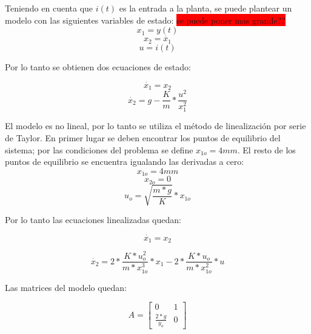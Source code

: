 \noindent Teniendo en cuenta que $i(t)$ es la entrada a la planta, se puede plantear un modelo con las siguientes variables de estado:\newline
\colorbox{red}{se puede poner mas grande??}
\begin{equation}
	x_{1}=y(t)
\end{equation}
\begin{equation}
	x_{2}=\dot{x_{1}}
\end{equation}
\begin{equation}
	u=i(t)
\end{equation}

\noindent Por lo tanto se obtienen dos ecuaciones de estado:

\begin{equation}
	\dot{x_{1}}=x_{2}
\end{equation}
\begin{equation}
	\dot{x_{2}}=g-\frac{K}{m}*\frac{u^{2}}{x_{1}^{2}}
\end{equation}

El modelo es no lineal, por lo tanto se utiliza el método de linealización por serie de Taylor. En primer lugar se deben encontrar los puntos de equilibrio del sistema; por las condiciones del problema se define $x_{1o}=4mm$. El resto de los puntos de equilibrio se encuentra igualando las derivadas a cero:
\begin{equation}
	x_{1o}=4mm
\end{equation}
\begin{equation}
	x_{2o}=0
\end{equation}
\begin{equation}
	u_{o}=\sqrt{\frac{m*g}{K}}*x_{1o}
\end{equation}

Por lo tanto las ecuaciones linealizadas quedan:

\begin{equation}
	\dot{x_{1}}=x_{2}
\end{equation}

\begin{equation}
	\dot{x_{2}}=2*\frac{K*u_{o}^{2}}{m*x_{1o}^{3}}*x_{1}-2*\frac{K*u_{o}}{m*x_{1o}^{2}}*u
\end{equation}

Las matrices del modelo quedan:

\begin{equation}
	A=\begin{bmatrix}
		0 & 1\\
		\frac{2*g}{y_{o}} & 0
	\end{bmatrix}
\end{equation}

